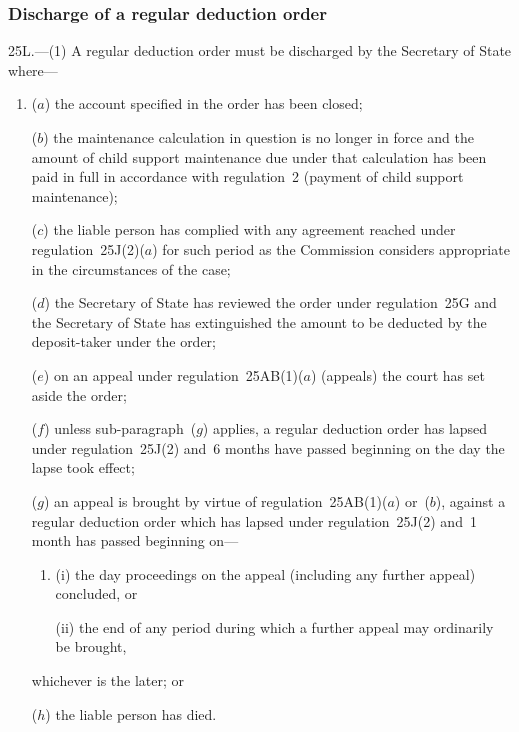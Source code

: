 \documentclass[12pt,a4paper]{article}
\begin{document}
\subsubsection[25L. Discharge of a regular deduction order]{Discharge of a regular deduction order}

25L.---(1)  A regular deduction order must be discharged by the 
Secretary of State  %
where—
\begin{enumerate}\item[]
($a$) the account specified in the order has been closed;

($b$) the maintenance calculation in question is no longer in force and the amount of child support maintenance due under that calculation has been paid in full in accordance with regulation~2 (payment of child support maintenance);

($c$) the liable person has complied with any agreement reached under regulation~25J(2)($a$)  for such period as the Commission considers appropriate in the circumstances of the case;

($d$) the 
Secretary of State  %
has reviewed the order under regulation~25G and 
the Secretary of State  %
has extinguished the amount to be deducted by the deposit-taker under the order;

($e$) on an appeal under regulation~25AB(1)($a$)  (appeals) the court has set aside the order;

($f$) unless sub-paragraph~($g$)  applies, a regular deduction order has lapsed under regulation~25J(2) and~6 months have passed beginning on the day the lapse took effect;

\begin{sloppypar}
($g$) an appeal is brought by virtue of regulation~25AB(1)($a$)  or~($b$), against a regular deduction order which has lapsed under regulation~25J(2) and~1 month has passed beginning on—
\end{sloppypar}
\begin{enumerate}\item[]
(i) the day proceedings on the appeal (including any further appeal) concluded, or

(ii) the end of any period during which a further appeal may ordinarily be brought,
\end{enumerate}
whichever is the later; or

($h$) the liable person has died.
\end{enumerate}
\end{document}
